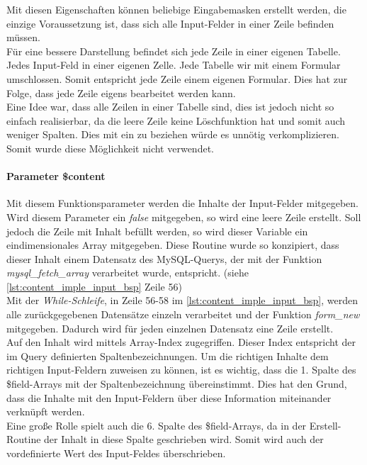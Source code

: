 Mit diesen Eigenschaften können beliebige Eingabemasken erstellt werden, die einzige Voraussetzung ist, dass sich alle Input-Felder in einer Zeile  befinden müssen.\\
Für eine bessere Darstellung befindet sich jede Zeile in einer eigenen Tabelle. Jedes Input-Feld in einer eigenen Zelle. Jede Tabelle wir mit einem Formular umschlossen. Somit entspricht jede Zeile einem eigenen Formular. Dies hat zur Folge, dass jede Zeile eigens bearbeitet werden kann.\\
Eine Idee war, dass alle Zeilen in einer Tabelle sind, dies ist jedoch nicht so einfach realisierbar, da die leere Zeile keine Löschfunktion hat und somit auch weniger Spalten. Dies mit ein zu beziehen würde es unnötig verkomplizieren. Somit wurde diese Möglichkeit nicht verwendet.
\paragraph{Parameter \$content\\}
Mit diesem Funktionsparameter werden die Inhalte der Input-Felder mitgegeben. Wird diesem Parameter ein \textit{false} mitgegeben, so wird eine leere Zeile erstellt. Soll jedoch die Zeile mit Inhalt befüllt werden, so wird dieser Variable ein eindimensionales Array mitgegeben. Diese Routine wurde so konzipiert, dass dieser Inhalt einem Datensatz des MySQL-Querys, der mit der Funktion \textit{mysql\_fetch\_array} verarbeitet wurde, entspricht. (siehe \autoref{lst:content_imple_input_bsp} Zeile 56)\\
Mit der \textit{While-Schleife}, in Zeile 56-58 im \autoref{lst:content_imple_input_bsp}, werden alle zurückgegebenen Datensätze einzeln verarbeitet und der Funktion \textit{form\_new} mitgegeben. Dadurch wird für jeden einzelnen Datensatz eine Zeile erstellt.\\
Auf den Inhalt wird mittels Array-Index zugegriffen. Dieser Index entspricht der im Query definierten Spaltenbezeichnungen. Um die richtigen Inhalte dem richtigen Input-Feldern zuweisen zu können, ist es wichtig, dass die 1. Spalte des \$field-Arrays mit der Spaltenbezeichnung übereinstimmt. Dies hat den Grund, dass die Inhalte mit den Input-Feldern über diese Information miteinander verknüpft werden.\\
Eine große Rolle spielt auch die 6. Spalte des \$field-Arrays, da in der Erstell-Routine der Inhalt in diese Spalte geschrieben wird. Somit wird auch der vordefinierte Wert des Input-Feldes überschrieben.\\

